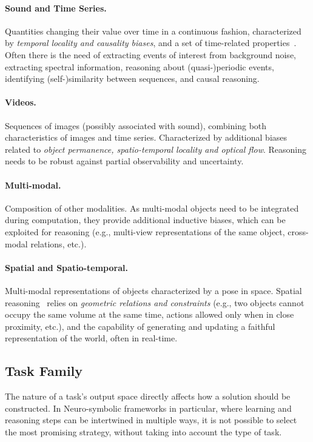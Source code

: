 \paragraph{Sound and Time Series.} Quantities changing their value over time in a continuous fashion, characterized by \textit{temporal locality and causality biases}, and a set of time-related properties~\cite{yan2022neuro}. Often there is the need of extracting events of interest from background noise, extracting spectral information, reasoning about (quasi-)periodic events, identifying (self-)similarity between sequences, and causal reasoning.

\paragraph{Videos.} Sequences of images (possibly associated with sound), combining both characteristics of images and time series. Characterized by additional biases related to \textit{object permanence, spatio-temporal locality and optical flow}. %
Reasoning needs to be robust against partial observability and uncertainty.

\paragraph{Multi-modal.} Composition of other modalities. As multi-modal objects need to be integrated during computation, they provide additional inductive biases, which can be exploited for reasoning (e.g., multi-view representations of the same object, cross-modal relations, etc.).

\paragraph{Spatial and Spatio-temporal.} Multi-modal representations of objects characterized by a pose in space. Spatial reasoning~\cite{lee2023neuro} relies on \textit{geometric relations and constraints} (e.g., two objects cannot occupy the same volume at the same time, actions allowed only when in close proximity, etc.), and the capability of generating and updating a faithful representation of the world, often in real-time.


\subsection{Task Family}
The nature of a task's output space directly affects how a solution should be constructed. In Neuro-symbolic frameworks in particular, where learning and reasoning steps can be intertwined in multiple ways, it is not possible to select the most promising strategy, without taking into account the type of task.

